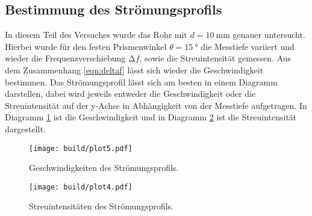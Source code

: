 \subsection{Bestimmung des Strömungsprofils}
In diesem Teil des Versuches wurde das Rohr mit $d = \SI{10}{\milli\meter}$ genauer untersucht. Hierbei wurde für den festen Prismenwinkel $\theta = \SI{15}{\degree}$ die Messtiefe variiert und wieder die 
Frequenzverschiebung $\increment f$, sowie die Streuintensität gemessen. Aus dem Zusammenhang \eqref{eqn:deltaf} lässt sich wieder die Geschwindigkeit bestimmen. Das Strömungsprofil lässt sich am besten in einem Diagramm darstellen,
dabei wird jeweils entweder die Geschwindigkeit oder die Streuintensität auf der y-Achse in Abhängigkeit von der Messtiefe aufgetragen. In Diagramm \ref{fig:plot4} ist die Geschwindigkeit und in Diagramm \ref{fig:plot5} ist die Streuintensität dargestellt.
\begin{figure}
    \centering
    \texttt{[image: build/plot5.pdf]}
    \caption{Geschwindigkeiten des Strömungsprofils.} 
    \label{fig:plot4}
\end{figure}
\begin{figure}
    \centering
    \texttt{[image: build/plot4.pdf]}
    \caption{Streuintensitäten des Strömungsprofils.} 
    \label{fig:plot5}
\end{figure}
